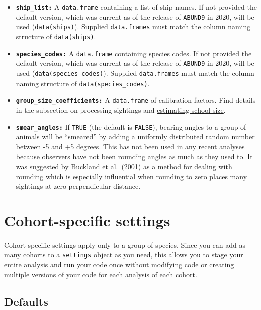 \documentclass[
]{book}
\begin{document}
\begin{itemize}
\item
  \textbf{\texttt{ship\_list:}} A \texttt{data.frame} containing a list of ship names. If not provided the default version, which was current as of the release of \texttt{ABUND9} in 2020, will be used (\texttt{data(ships)}). Supplied \texttt{data.frames} must match the column naming structure of \texttt{data(ships)}.
\item
  \textbf{\texttt{species\_codes:}} A \texttt{data.frame} containing species codes. If not provided the default version, which was current as of the release of \texttt{ABUND9} in 2020, will be used (\texttt{data(species\_codes)}). Supplied \texttt{data.frames} must match the column naming structure of \texttt{data(species\_codes)}.
\item
  \textbf{\texttt{group\_size\_coefficients:}} A \texttt{data.frame} of calibration factors. Find details in the subsection on processing sightings and \protect\hyperlink{ss_calibration}{estimating school size}.
\item
  \textbf{\texttt{smear\_angles:}} If \texttt{TRUE} (the default is \texttt{FALSE}), bearing angles to a group of animals will be ``smeared'' by adding a uniformly distributed random number between -5 and +5 degrees. This has not been used in any recent analyses because observers have not been rounding angles as much as they used to. It was suggested by \href{https://distancesampling.org/whatisds.html\#books}{Buckland et al.~(2001)} as a method for dealing with rounding which is especially influential when rounding to zero places many sightings at zero perpendicular distance.
\end{itemize}

\hypertarget{cohort-specific-settings}{%
\section*{Cohort-specific settings}\label{cohort-specific-settings}}

Cohort-specific settings apply only to a group of species. Since you can add as many cohorts to a \texttt{settings} object as you need, this allows you to stage your entire analysis and run your code once without modifying code or creating multiple versions of your code for each analysis of each cohort.

\hypertarget{defaults-1}{%
\subsection*{Defaults}\label{defaults-1}}
\end{document}
